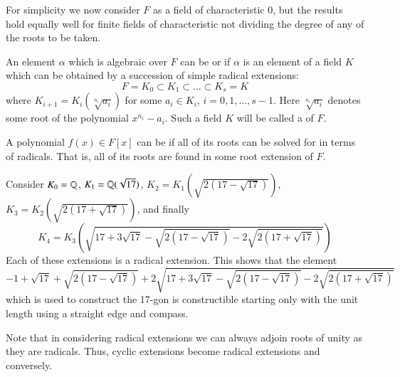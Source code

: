 For simplicity we now consider $F$ as a field of characteristic $0$, but the results hold equally well for finite fields of characteristic not dividing the degree of any of the roots to be taken.

\begin{definition}
    An element $\alpha$ which is algebraic over $F$ can be  or  if $\alpha$ is an element of a field $K$ which can be obtained by a succession of simple radical extensions:\begin{equation*}
        F = K_0 \subset K_1 \subset ... \subset K_s = K
    \end{equation*}
    where $K_{i+1} = K_i(\sqrt[n_i]{a_i})$ for some $a_i \in K_i$, $i = 0,1,...,s-1$. Here $\sqrt[n_i]{a_i}$ denotes some root of the polynomial $x^{n_i}-a_i$. Such a field $K$ will be called a  of $F$.
\end{definition}

\begin{definition}
    A polynomial $f(x) \in F[x]$ can be  if all of its roots can be solved for in terms of radicals. That is, all of its roots are found in some root extension of $F$.
\end{definition}

\begin{example}
    Consider $K_0 = \mathbb Q$, $K_1 = \mathbb Q(\sqrt{17})$, $K_2 = K_1(\sqrt{2(17-\sqrt{17})})$, $K_3 = K_2(\sqrt{2(17+\sqrt{17})})$, and finally \begin{equation*}
        K_4 = K_3\left(\sqrt{17+3\sqrt{17}-\sqrt{2(17-\sqrt{17})}-2\sqrt{2(17+\sqrt{17})}}\right)
    \end{equation*}
    Each of these extensions is a radical extension. This shows that the element \begin{equation*}
        -1+\sqrt{17}+\sqrt{2(17-\sqrt{17})} +2\sqrt{17+3\sqrt{17}-\sqrt{2(17-\sqrt{17})}-2\sqrt{2(17+\sqrt{17})}}
    \end{equation*}
    which is used to construct the 17-gon is constructible starting only with the unit length using a straight edge and compass.
\end{example}

Note that in considering radical extensions we can always adjoin roots of unity as they are radicals. Thus, cyclic extensions become radical extensions and conversely.

